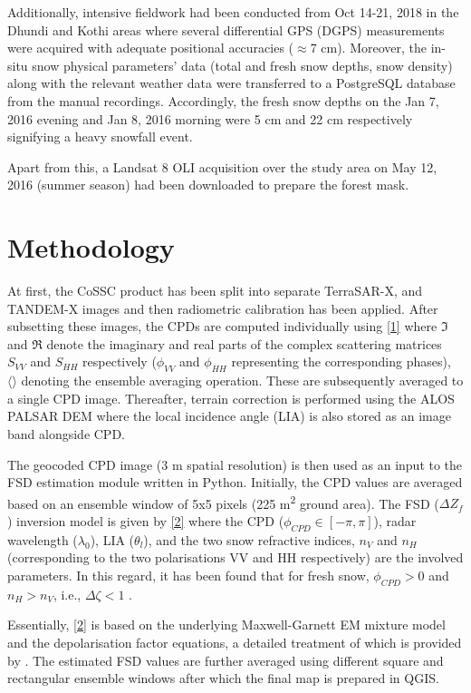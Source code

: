 \documentclass{article}
\begin{document}
Additionally, intensive fieldwork had been conducted from Oct 14-21, 2018 in the Dhundi and Kothi areas where several differential GPS (DGPS) measurements were acquired with adequate positional accuracies ($\approx$7 cm). Moreover, the in-situ snow physical parameters’ data (total and fresh snow depths, snow density) along with the relevant weather data were transferred to a PostgreSQL database from the manual recordings. Accordingly, the fresh snow depths on the Jan 7, 2016 evening and Jan 8, 2016 morning were 5 cm and 22 cm respectively signifying a heavy snowfall event.

Apart from this, a Landsat 8 OLI acquisition over the study area on May 12, 2016 (summer season) had been downloaded to prepare the forest mask.    

\section{Methodology}
\label{sec:method}
At first, the CoSSC product has been split into separate TerraSAR-X, and TANDEM-X images and then radiometric calibration has been applied. After subsetting these images, the CPDs are computed individually using \eqref{1} where $\Im$ and $\Re$ denote the imaginary and real parts of the complex scattering matrices $S_{VV}$ and $S_{HH}$ respectively ($\phi_{VV}$ and $\phi_{HH}$ representing the corresponding phases), $\langle\rangle$ denoting the ensemble averaging operation. These are subsequently averaged to a single CPD image. Thereafter, terrain correction is performed using the ALOS PALSAR DEM where the local incidence angle (LIA) is also stored as an image band alongside CPD. 

The geocoded CPD image (3 m spatial resolution) is then used as an input to the FSD estimation module written in Python. Initially, the CPD values are averaged based on an ensemble window of 5x5 pixels (225 m\textsuperscript{2} ground area). The FSD ($\Delta Z_f$) inversion model is given by \eqref{2} where the CPD ($\phi_{CPD}\in[-\pi,\pi]$), radar wavelength ($\lambda_0$), LIA ($\theta_l$), and the two snow refractive indices, $n_V$ and $n_H$ (corresponding to the two polarisations VV and HH respectively) are the involved parameters. In this regard, it has been found that for fresh snow,  $\phi_{CPD}>0$ and $n_H>n_V$, i.e., $\Delta{\zeta}<1$ \cite{Leinss2014}.

Essentially, \eqref{2} is based on the underlying Maxwell-Garnett EM mixture model and the depolarisation factor equations, a detailed treatment of which is provided by \cite{Sihvola1999}. The estimated FSD values are further averaged using different square and rectangular ensemble windows after which the final map is prepared in QGIS.
\end{document}
